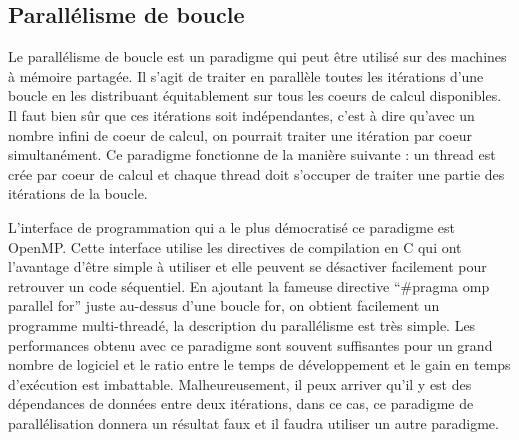 \subsection{Parallélisme de boucle}
Le parallélisme de boucle est un paradigme qui peut être utilisé sur des machines à mémoire partagée.
%
Il s'agit de traiter en parallèle toutes les itérations d'une boucle en les distribuant équitablement sur tous les coeurs de calcul disponibles.
%
Il faut bien sûr que ces itérations soit indépendantes, c'est à dire qu'avec un nombre infini de coeur de calcul, on pourrait traiter une itération par coeur simultanément.
%
Ce paradigme fonctionne de la manière suivante : un thread est crée par coeur de calcul et chaque thread doit s'occuper de traiter une partie des itérations de la boucle.
%


L'interface de programmation qui a le plus démocratisé ce paradigme est OpenMP.
%
Cette interface utilise les directives de compilation en C qui ont l'avantage d'être simple à utiliser et elle peuvent se désactiver facilement pour retrouver un code séquentiel.
%
En ajoutant la fameuse directive ``\#pragma omp parallel for'' juste au-dessus d'une boucle for, on obtient facilement un programme multi-threadé, la description du parallélisme est très simple.
%
Les performances obtenu avec ce paradigme sont souvent suffisantes pour un grand nombre de logiciel et le ratio entre le temps de développement et le gain en temps d'exécution est imbattable.
%
Malheureusement, il peux arriver qu'il y est des dépendances de données entre deux itérations, dans ce cas, ce paradigme de parallélisation donnera un résultat faux et il faudra utiliser un autre paradigme.

